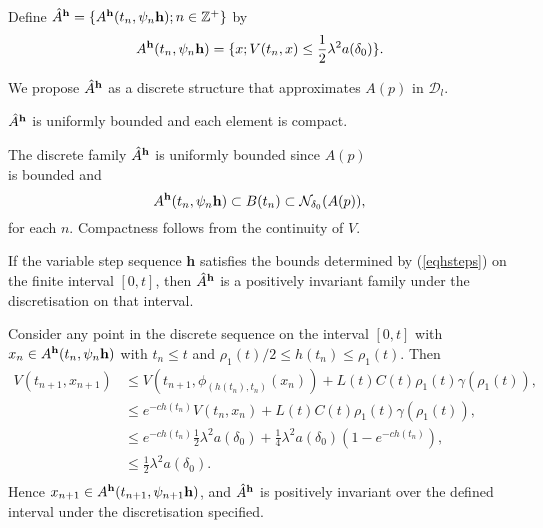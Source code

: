 \begin{defn}[A1]
Define $\hat{A}^{{\bf h}} = \{ A^{{\bf h}}( t_n, \psi_n{\bf h}); n \in
\mathbb{Z}^+ \}$ by
\[  A^{{\bf h}}( t_n, \psi_n {\bf h}) = \{ x ; V(t_n, x) \leq \frac{1}{2}
                \lambda^2 a(\delta_0) \}. \]
\end{defn}
We propose $\hat{A}^{{\bf h}}$ as a discrete structure that approximates
$A(p)$ in $\mathcal{D}_l$.

\begin{lemma}
$\hat{A}^{{\bf h}}$ is uniformly bounded and each element is compact.
\end{lemma}
\begin{prf}
The discrete family $\hat{A}^{{\bf h}}$ is uniformly bounded since $A(p)$ \\ is
bounded and
\[ A^{{\bf h}}(t_n, \psi_n{\bf h}) \subset B(t_n) \subset
         \mathcal{N}_{\delta_0}(A(p)), \]
for each $n$. Compactness follows from the continuity of $V$.
\end{prf}

\begin{lemma}
If the variable step sequence {\bf h}  satisfies the bounds determined by
(\ref{eqhsteps}) on the finite interval $[0,t ]$,
then $\hat{A}^{{\bf h}}$ is a positively invariant family under the
discretisation on that interval.
\end{lemma}
\begin{prf}
Consider any point in the discrete sequence on the interval $[0,t]$ with
$x_n \in A^{{\bf h}}(t_n, \psi_n{\bf h})$ with $t_n \leq t$  and $\rho_1(t)/2
\leq h(t_n) \leq \rho_1(t)$. Then
\begin{align*}
  V(t_{n+1},  x_{n+1}) &\leq V(t_{n+1},
              \phi_{(h(t_n), t_n)}(x_n)) + L(t)C(t)\rho_1(t) \gamma(\rho_1(t)),
               \\
    &\leq e^{-ch(t_n)} V(t_n, x_n) + L(t)C(t)\rho_1(t) \gamma(\rho_1(t)), \\
    &\leq e^{-ch(t_n)} \frac{1}{2}\lambda^2 a(\delta_0) +
      \frac{1}{4} \lambda^2 a(\delta_0)(1 - e^{-ch(t_n)}), \\
    &\leq \frac{1}{2} \lambda^2 a(\delta_0). \\
\end{align*}
Hence $x_{n + 1} \in A^{{\bf h}}(t_{n+1}, \psi_{n+1}{\bf h})$, and
$\hat{A}^{{\bf h}}$ is positively invariant over the defined interval under the
discretisation specified.
\end{prf}

